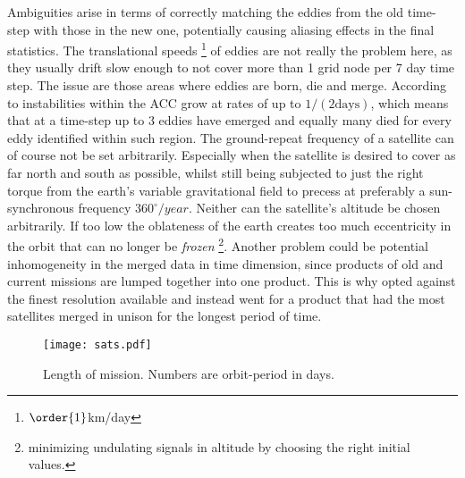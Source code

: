 Ambiguities arise in terms of correctly matching the eddies from the old time-step with those in the new one, potentially causing aliasing effects in the final
statistics. The translational speeds \footnote{$\order{1}$km/day} of eddies are not really the problem here, as they usually drift slow enough to not cover more
than 1 grid node per 7 day time step. The issue are those areas where eddies are born, die and merge. According to \citet{Smith2009} instabilities within the ACC
grow at rates of up to $1/(2 \mathrm{days})$, which means that at a time-step up to 3 eddies have emerged and equally many died for every eddy identified within
such region. The ground-repeat frequency of a satellite can of course not be set arbitrarily. Especially when the satellite is desired to cover as far north and
south as possible, whilst still being subjected to just the right torque from the earth's variable gravitational field to precess at preferably a
sun-synchronous frequency \ie $360^{\circ}/year$. Neither can the
satellite's altitude be chosen arbitrarily. If too low the oblateness of the earth creates too much eccentricity in the orbit that can no longer be
\textit{frozen} \footnote{minimizing undulating signals in altitude by choosing the right initial values.}. Another problem could be potential inhomogeneity in
the merged data in time dimension, since products of old and current missions are lumped together into one product. This is why \citet{Chelton2011} opted against
the finest resolution available and instead went for a product that had the most satellites merged in unison for the longest period of time.

\begin{figure}
\texttt{[image: sats.pdf]}
\caption{Length of mission. Numbers are orbit-period in days.}
\label{fig:lengthOfMission}
\end{figure}


